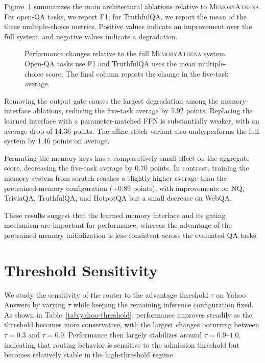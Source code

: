 Figure~\ref{fig:ablation-delta} summarizes the main architectural ablations
relative to \textsc{MemoryAthena}. For open-QA tasks, we report F1; for
TruthfulQA, we report the mean of the three multiple-choice metrics. Positive
values indicate an improvement over the full system, and negative values
indicate a degradation.

\begin{figure}[h]
    \centering
    \caption{
    Performance changes relative to the full \textsc{MemoryAthena} system.
    Open-QA tasks use F1 and TruthfulQA uses the mean multiple-choice score.
    The final column reports the change in the five-task average.
    }
    \label{fig:ablation-delta}
\end{figure}

Removing the output gate causes the largest degradation among the
memory-interface ablations, reducing the five-task average by 5.92 points.
Replacing the learned interface with a parameter-matched FFN is substantially
weaker, with an average drop of 14.36 points. The affine-stitch variant also
underperforms the full system by 1.46 points on average.

Permuting the memory keys has a comparatively small effect on the aggregate
score, decreasing the five-task average by 0.70 points. In contrast, training
the memory system from scratch reaches a slightly higher average than the
pretrained-memory configuration (+0.89 points), with improvements on NQ,
TriviaQA, TruthfulQA, and HotpotQA but a small decrease on WebQA.

These results suggest that the learned memory interface and its gating
mechanism are important for performance, whereas the advantage of the
pretrained memory initialization is less consistent across the evaluated QA
tasks.
\section{Threshold Sensitivity}
\label{app:classification}

We study the sensitivity of the router to the advantage threshold $\tau$ on
Yahoo Answers by varying $\tau$ while keeping the remaining inference
configuration fixed. As shown in Table~\ref{tab:yahoo-threshold}, performance
improves steadily as the threshold becomes more conservative, with the largest
changes occurring between $\tau=0.3$ and $\tau=0.9$. Performance then largely
stabilizes around $\tau=0.9$--$1.0$, indicating that routing behavior is
sensitive to the admission threshold but becomes relatively stable in the
high-threshold regime.

